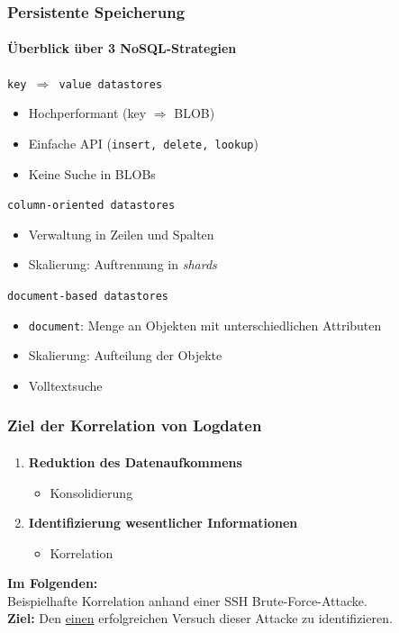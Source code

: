 \begin{frame}
\frametitle{Persistente Speicherung}
\framesubtitle{Überblick über 3 NoSQL-Strategien}
\pause
\begin{block}{\texttt{key $\Rightarrow$ value datastores}}
    \begin{itemize}
        \item Hochperformant (key $\Rightarrow$ BLOB)
        \item Einfache API (\texttt{insert, delete, lookup})
        \item \color{red} Keine Suche in BLOBs
    \end{itemize}
\end{block}
\pause
\begin{block}{\texttt{column-oriented datastores}}
    \begin{itemize}
        \item Verwaltung in Zeilen und Spalten
        \item Skalierung: Auftrennung in \textit{shards}
    \end{itemize}
\end{block}
\pause
\begin{block}{\texttt{document-based datastores}}
    \begin{itemize}
        \item \texttt{document}: Menge an Objekten mit unterschiedlichen Attributen
        \item Skalierung: Aufteilung der Objekte
        \item \color{green} Volltextsuche
    \end{itemize}
\end{block}
\end{frame}

\begin{frame}
\frametitle{Ziel der Korrelation von Logdaten}
\framesubtitle{}

\begin{enumerate}
    \pause
    \item \textbf{Reduktion des Datenaufkommens}
    \begin{itemize}
       \item Konsolidierung
    \end{itemize}
    \pause
    \item \textbf{Identifizierung wesentlicher Informationen}
    \begin{itemize}
        \item Korrelation

    \end{itemize}

\end{enumerate}
\pause
\vspace{0.7cm}
\textbf{Im Folgenden:}\\
\vspace{0.5cm}
Beispielhafte Korrelation anhand einer SSH Brute-Force-Attacke.\\
\vspace{0.5cm}
\textbf{Ziel:} Den {\color{red}\underline{einen}} erfolgreichen Versuch dieser Attacke zu 
identifizieren.
\end{frame}

